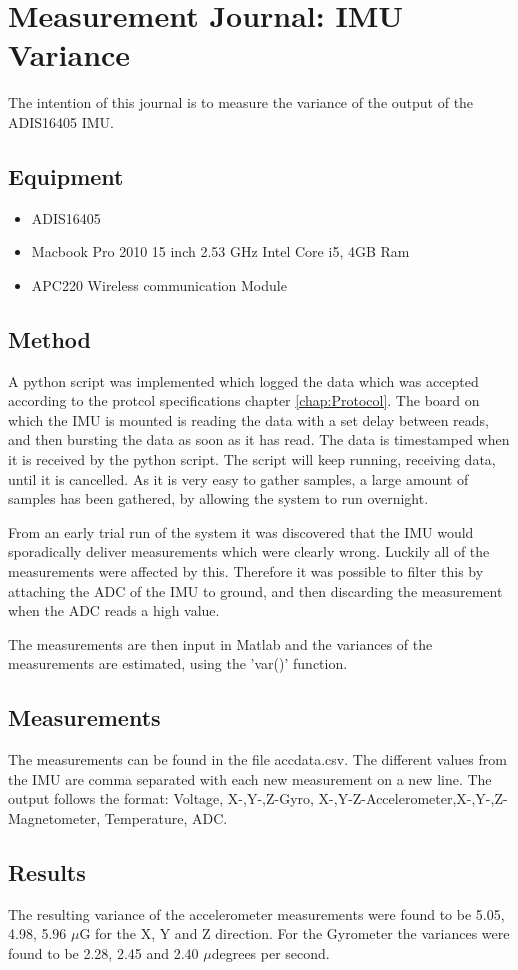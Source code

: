 \chapter{Measurement Journal: IMU Variance}
\label{chap:MeasJourIMU}
The intention of this journal is to measure the variance of the output of the ADIS16405 IMU.
\section{Equipment}
\begin{itemize}
\item ADIS16405
\item Macbook Pro 2010 15 inch 2.53 GHz Intel Core i5, 4GB Ram
\item APC220 Wireless communication Module
\end{itemize}

\section{Method}
A python script was implemented which logged the data which was accepted according to the protcol specifications chapter \ref{chap:Protocol}. The board on which the IMU is mounted is reading the data with a set delay between reads, and then bursting the data as soon as it has read. The data is timestamped when it is received by the python script. The script will keep running, receiving data, until it is cancelled. As it is very easy to gather samples, a large amount of samples has been gathered, by allowing the system to run overnight.

From an early trial run of the system it was discovered that the IMU would sporadically deliver measurements which were clearly wrong. Luckily all of the measurements were affected by this. Therefore it was possible to filter this by attaching the ADC of the IMU to ground, and then discarding the measurement when the ADC reads a high value.

The measurements are then input in Matlab and the variances of the measurements are estimated, using the 'var()' function.

\section{Measurements}
The measurements can be found in the file accdata.csv. The different values from the IMU are comma separated with each new measurement on a new line. The output follows the format: Voltage, X-,Y-,Z-Gyro, X-,Y-Z-Accelerometer,X-,Y-,Z-Magnetometer, Temperature, ADC.
\section{Results}
The resulting variance of the accelerometer measurements were found to be 5.05, 4.98, 5.96 $\mu$G for the X, Y and Z direction. 
For the Gyrometer the variances were found to be 2.28, 2.45 and 2.40 $\mu$degrees per second.
